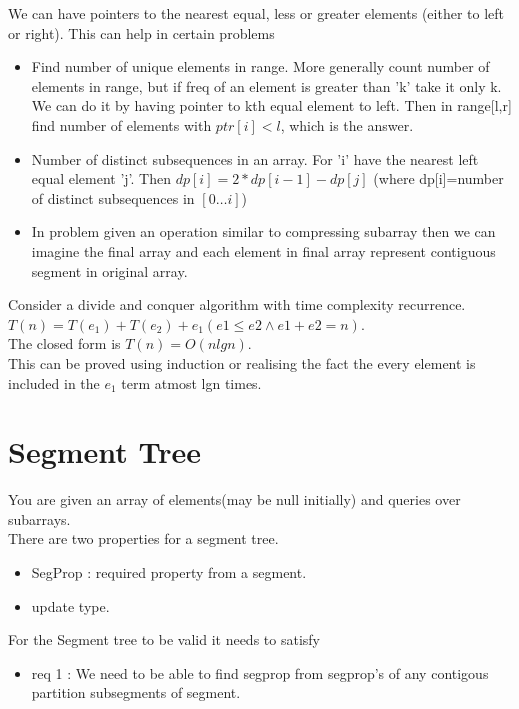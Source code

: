 \documentclass[../Notes.tex]{subfiles}
\begin{document}
We can have pointers to the nearest equal, less or greater elements (either to left or right). This can help in certain problems
\begin{itemize}
	\item Find number of unique elements in range. More generally count number of elements in range, but if freq of an element is greater than 'k' take it only k.\\
	We can do it by having pointer to kth equal element to left. Then in range[l,r] find number of elements with $ptr[i]<l$, which is the answer.
	\item Number of distinct subsequences in an array. For 'i' have the nearest left equal element 'j'. Then $dp[i]=2*dp[i-1]-dp[j]$ (where dp[i]=number of distinct subsequences in $[0\ldots i]$)
	\item In problem given an operation similar to compressing subarray then we can imagine the final array and each element in final array represent contiguous segment in original array. 
\end{itemize}

Consider a divide and conquer algorithm with time complexity recurrence.
$T(n)=T(e_1)+T(e_2)+e_1 (e1\leq e2 \wedge e1+e2=n)$.\\ 
The closed form is $T(n) = O(nlgn)$.\\
This can be proved using induction or realising the fact the every element is included in the $e_1$ term atmost lgn times.\\

\section{Segment Tree}
You are given an array of elements(may be null initially) and queries over subarrays.\\
There are two properties for a segment tree.
\begin{itemize}
	\item SegProp : required property from a segment.
	\item update type.
\end{itemize}

For the Segment tree to be valid it needs to satisfy
\begin{itemize}
	\item req 1 : We need to be able to find segprop from segprop's of any contigous partition subsegments of segment. 
\end{itemize}
\end{document}
